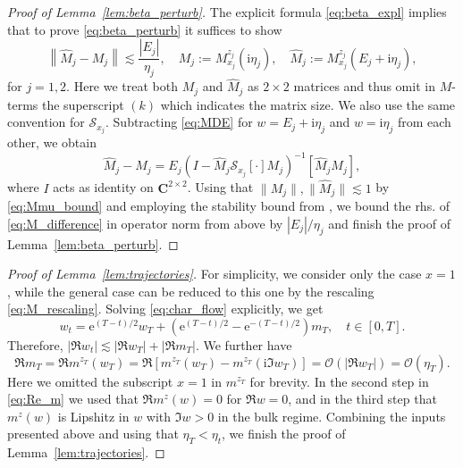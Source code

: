 \documentclass[10pt]{amsart}
\numberwithin{equation}{section}
\newcommand{\C}{\mathbf{C}}
\newcommand{\ii}{\mathrm{i}}
\newcommand{\ee}{\mathrm{e}}
\begin{document}
\begin{proof}[Proof of Lemma~\ref{lem:beta_perturb}] The explicit formula \eqref{eq:beta_expl} implies that to prove \eqref{eq:beta_perturb} it suffices to show
\begin{equation}
\left\lVert \widehat{M}_j-M_j\right\rVert\lesssim \frac{|E_j|}{\eta_j},\quad M_j:=M_{x_j}^{z_j}(\ii\eta_j),\quad \widehat{M}_j:=M_{x_j}^{z_j}(E_j+\ii\eta_j),
\label{eq:M_perturb}
\end{equation} 
for $j=1,2$. Here we treat both $M_j$ and $\widehat{M}_j$ as $2\times 2$ matrices and thus omit in $M$-terms the superscript $(k)$ which indicates the matrix size. We also use the same convention for $\mathcal{S}_{x_j}$. Subtracting \eqref{eq:MDE} for $w=E_j+\ii\eta_j$ and $w=\ii\eta_j$ from each other, we obtain
\begin{equation}
\widehat{M}_j-M_j=E_j\left(I-\widehat{M}_j\mathcal{S}_{x_j}[\cdot]M_j\right)^{-1}[\widehat{M}_jM_j],
\label{eq:M_difference}
\end{equation}
where $I$ acts as identity on $\C^{2\times 2}$. Using that $\|M_j\|,\|\widehat{M}_j\|\lesssim 1$ by \eqref{eq:Mmu_bound} and employing the stability bound from \cite[Lemma~6.1]{macroCLT_real}, we bound the rhs. of \eqref{eq:M_difference} in operator norm from above by $|E_j|/\eta_j$ and finish the proof of Lemma~\ref{lem:beta_perturb}.
\end{proof}

\begin{proof}[Proof of Lemma~\ref{lem:trajectories}] For simplicity, we consider only the case $x=1$, while the general case can be reduced to this one by the rescaling \eqref{eq:M_rescaling}. Solving \eqref{eq:char_flow} explicitly, we get 
\begin{equation}
w_t =\ee^{(T-t)/2}w_T +\left(\ee^{(T-t)/2}-\ee^{-(T-t)/2}\right) m_T,\quad t\in [0,T].
\label{eq:wt_eplicit}
\end{equation}
Therefore, $|\Re w_t|\lesssim |\Re w_T|+|\Re m_T|$. We further have
\begin{equation}
\Re m_T = \Re m^{z_T}(w_T) = \Re \left[ m^{z_T}(w_T)- m^{z_T}(\ii\Im w_T)\right] =\mathcal{O}\left(|\Re w_T|\right) =\mathcal{O}\left(\eta_T\right).
\label{eq:Re_m}
\end{equation}
Here we omitted the subscript $x=1$ in $m^{z_T}$ for brevity. In the second step in \eqref{eq:Re_m} we used that $\Re m^z(w)=0$ for $\Re w=0$, and in the third step that $m^z(w)$ is Lipshitz in $w$ with $\Im w>0$ in the bulk regime. Combining the inputs presented above and using that $\eta_T<\eta_t$, we finish the proof of Lemma~\ref{lem:trajectories}.
\end{proof}
\end{document}
